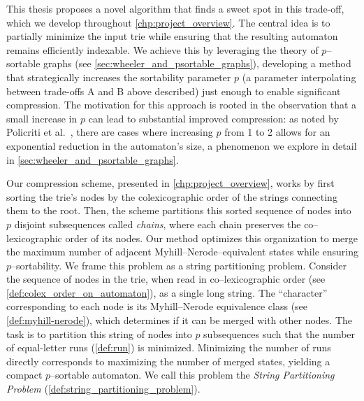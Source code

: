 This thesis proposes a novel algorithm that finds a sweet spot in this trade-off, which we develop throughout \cref{chp:project_overview}. The central idea is to partially minimize the input trie while ensuring that the resulting automaton remains efficiently indexable. We achieve this by leveraging the theory of $p$--sortable graphs (see \cref{sec:wheeler_and_psortable_graphs}), developing a method that strategically increases the sortability parameter $p$ (a parameter interpolating between trade-offs A and B above described) just enough to enable significant compression. The motivation for this approach is rooted in the observation that a small increase in $p$ can lead to substantial improved compression: as noted by Policriti et al.~\cite{manziniRationalConstructionWheeler2024}, there are cases where increasing $p$ from 1 to 2 allows for an exponential reduction in the automaton's size, a phenomenon we explore in detail in \cref{sec:wheeler_and_psortable_graphs}.

Our compression scheme, presented in \cref{chp:project_overview}, works by first sorting the trie's nodes by the colexicographic order of the strings connecting them to the root. Then, the scheme partitions this sorted sequence of nodes into $p$ disjoint subsequences called \emph{chains}, where each chain preserves the co--lexicographic order of its nodes. Our method optimizes this organization to merge the maximum number of adjacent Myhill--Nerode--equivalent states while ensuring $p$--sortability. 
We frame this problem as a string partitioning problem. Consider the sequence of nodes in the trie, when read in co--lexicographic order (see \cref{def:colex_order_on_automaton}), as a single long string. The ``character'' corresponding to each node is its Myhill--Nerode equivalence class (see \cref{def:myhill-nerode}), which determines if it can be merged with other nodes. The task is to partition this string of nodes into $p$ subsequences such that the number of equal-letter runs (\cref{def:run}) is minimized. Minimizing the number of runs directly corresponds to maximizing the number of merged states, yielding a compact $p$--sortable automaton. We call this problem the \emph{String Partitioning Problem} (\cref{def:string_partitioning_problem}).

